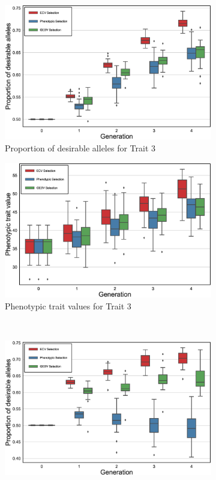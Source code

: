 \documentclass[12pt, a4paper, bibliography=totoc]{scrartcl}
\begin{document}
\begin{figure}[htb!]
    \centering
   \begin{subfigure}[h!t]{0.4\textwidth}
        \centering
    \includegraphics[scale=0.25]{Figures/MO_proportion_trait3.eps}
    \caption{Proportion of desirable alleles for Trait 3}\label{fig.3a}
    \end{subfigure}
    \hfill
    \begin{subfigure}[h!t]{0.4\textwidth}
    \centering
    \includegraphics[scale=0.25]{Figures/MO_pheno_values_trait3.eps}
    \caption{Phenotypic trait values for Trait 3}\label{fig.3b}
    \end{subfigure}
    \\
      \begin{subfigure}[h!t]{0.4\textwidth}
    \centering
    \includegraphics[scale=0.25]{Figures/MO_proportion_trait1.eps}

\end{subfigure}
\end{figure}
\end{document}

